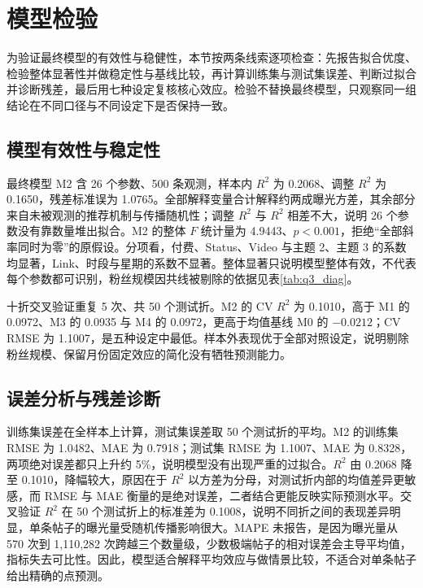 \section{模型检验}

为验证最终模型的有效性与稳健性，本节按两条线索逐项检查：先报告拟合优度、检验整体显著性并做稳定性与基线比较，再计算训练集与测试集误差、判断过拟合并诊断残差，最后用七种设定复核核心效应。检验不替换最终模型，只观察同一组结论在不同口径与不同设定下是否保持一致。

\subsection{模型有效性与稳定性}

最终模型 M2 含 26 个参数、500 条观测，样本内 $R^2$ 为 0.2068、调整 $R^2$ 为 0.1650，残差标准误为 1.0765。全部解释变量合计解释约两成曝光方差，其余部分来自未被观测的推荐机制与传播随机性；调整 $R^2$ 与 $R^2$ 相差不大，说明 26 个参数没有靠数量堆出拟合。M2 的整体 $F$ 统计量为 4.9443、$p<0.001$，拒绝“全部斜率同时为零”的原假设。分项看，付费、Status、Video 与主题 2、主题 3 的系数均显著，Link、时段与星期的系数不显著。整体显著只说明模型整体有效，不代表每个参数都可识别，粉丝规模因共线被剔除的依据见表\ref{tab:q3_diag}。

十折交叉验证重复 5 次、共 50 个测试折。M2 的 CV $R^2$ 为 0.1010，高于 M1 的 0.0972、M3 的 0.0935 与 M4 的 0.0972，更高于均值基线 M0 的 $-0.0212$；CV RMSE 为 1.1007，是五种设定中最低。样本外表现优于全部对照设定，说明剔除粉丝规模、保留月份固定效应的简化没有牺牲预测能力。

\subsection{误差分析与残差诊断}

训练集误差在全样本上计算，测试集误差取 50 个测试折的平均。M2 的训练集 RMSE 为 1.0482、MAE 为 0.7918；测试集 RMSE 为 1.1007、MAE 为 0.8328，两项绝对误差都只上升约 5\%，说明模型没有出现严重的过拟合。$R^2$ 由 0.2068 降至 0.1010，降幅较大，原因在于 $R^2$ 以方差为分母，对测试折内部的均值差异更敏感，而 RMSE 与 MAE 衡量的是绝对误差，二者结合更能反映实际预测水平。交叉验证 $R^2$ 在 50 个测试折上的标准差为 0.1008，说明不同折之间的表现差异明显，单条帖子的曝光量受随机传播影响很大。MAPE 未报告，是因为曝光量从 570 次到 1,110,282 次跨越三个数量级，少数极端帖子的相对误差会主导平均值，指标失去可比性。因此，模型适合解释平均效应与做情景比较，不适合对单条帖子给出精确的点预测。

